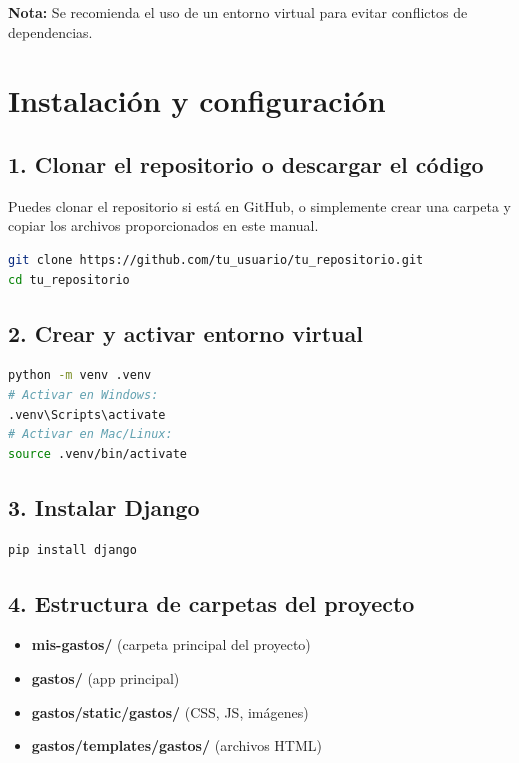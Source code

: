 \documentclass[12pt,a4paper]{article}
\begin{document}
\textbf{Nota:} Se recomienda el uso de un entorno virtual para evitar conflictos de dependencias.

\section{Instalación y configuración}

\subsection{1. Clonar el repositorio o descargar el código}

Puedes clonar el repositorio si está en GitHub, o simplemente crear una carpeta y copiar los archivos proporcionados en este manual.

\begin{lstlisting}[language=bash]
git clone https://github.com/tu_usuario/tu_repositorio.git
cd tu_repositorio
\end{lstlisting}

\subsection{2. Crear y activar entorno virtual}

\begin{lstlisting}[language=bash]
python -m venv .venv
# Activar en Windows:
.venv\Scripts\activate
# Activar en Mac/Linux:
source .venv/bin/activate
\end{lstlisting}

\subsection{3. Instalar Django}

\begin{lstlisting}[language=bash]
pip install django
\end{lstlisting}

\subsection{4. Estructura de carpetas del proyecto}

\begin{itemize}
    \item \textbf{mis-gastos/} (carpeta principal del proyecto)
    \item \textbf{gastos/} (app principal)
    \item \textbf{gastos/static/gastos/} (CSS, JS, imágenes)
    \item \textbf{gastos/templates/gastos/} (archivos HTML)
\end{itemize}
\end{document}
